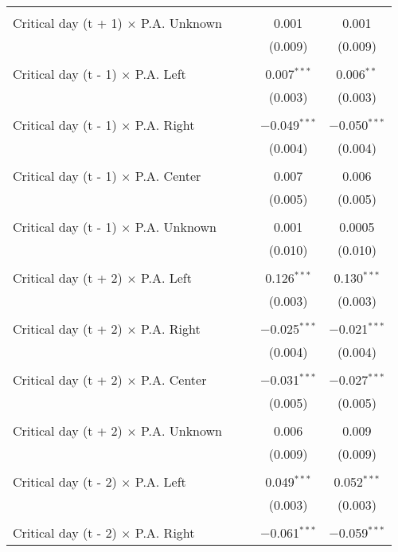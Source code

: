 \documentclass[
]{article}
\begin{document}
\begin{table}[!htbp]
{\begin{tabular}{@{\extracolsep{5pt}}lcccc}
  & & & & \\ 
 Critical day (t + 1) $\times$ P.A. Unknown &  &  & 0.001 & 0.001 \\ 
  &  &  & (0.009) & (0.009) \\ 
  & & & & \\ 
 Critical day (t - 1) $\times$ P.A. Left &  &  & 0.007$^{***}$ & 0.006$^{**}$ \\ 
  &  &  & (0.003) & (0.003) \\ 
  & & & & \\ 
 Critical day (t - 1) $\times$ P.A. Right &  &  & $-$0.049$^{***}$ & $-$0.050$^{***}$ \\ 
  &  &  & (0.004) & (0.004) \\ 
  & & & & \\ 
 Critical day (t - 1) $\times$ P.A. Center &  &  & 0.007 & 0.006 \\ 
  &  &  & (0.005) & (0.005) \\ 
  & & & & \\ 
 Critical day (t - 1) $\times$ P.A. Unknown &  &  & 0.001 & 0.0005 \\ 
  &  &  & (0.010) & (0.010) \\ 
  & & & & \\ 
 Critical day (t + 2) $\times$ P.A. Left &  &  & 0.126$^{***}$ & 0.130$^{***}$ \\ 
  &  &  & (0.003) & (0.003) \\ 
  & & & & \\ 
 Critical day (t + 2) $\times$ P.A. Right &  &  & $-$0.025$^{***}$ & $-$0.021$^{***}$ \\ 
  &  &  & (0.004) & (0.004) \\ 
  & & & & \\ 
 Critical day (t + 2) $\times$ P.A. Center &  &  & $-$0.031$^{***}$ & $-$0.027$^{***}$ \\ 
  &  &  & (0.005) & (0.005) \\ 
  & & & & \\ 
 Critical day (t + 2) $\times$ P.A. Unknown &  &  & 0.006 & 0.009 \\ 
  &  &  & (0.009) & (0.009) \\ 
  & & & & \\ 
 Critical day (t - 2) $\times$ P.A. Left &  &  & 0.049$^{***}$ & 0.052$^{***}$ \\ 
  &  &  & (0.003) & (0.003) \\ 
  & & & & \\ 
 Critical day (t - 2) $\times$ P.A. Right &  &  & $-$0.061$^{***}$ & $-$0.059$^{***}$ \\ 

\end{tabular}}
\end{table}
\end{document}

